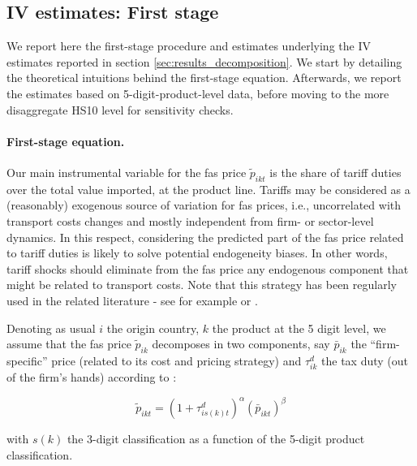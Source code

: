 \documentclass[a4paper,11pt]{article}
\begin{document}
\subsection{IV estimates: First stage \label{app:first_stage_IV}}

We report here the first-stage procedure and estimates underlying the IV estimates reported in section \ref{sec:results_decomposition}. We start by detailing the theoretical intuitions behind the first-stage equation. Afterwards, we report the estimates based on 5-digit-product-level data, before moving to the more disaggregate HS10 level for sensitivity checks.

\paragraph{First-stage equation.}

Our main instrumental variable for the fas price $\widetilde{p}_{ikt}$ is the share of tariff duties over the total value imported, at the product line. Tariffs may be considered as a (reasonably) exogenous source of variation for fas prices, i.e., uncorrelated with transport costs changes and mostly independent from firm- or sector-level dynamics. In this respect, considering the predicted part of the fas price related to tariff duties is likely to solve potential endogeneity biases. In other words, tariff shocks should eliminate from the fas price any endogenous component that might be related to transport costs. Note that this strategy has been regularly used in the related literature - see for example \citet{Caliendo_Parro_2015} or \citet{Lashkaripour-2017}.

Denoting as usual $i$ the origin country, $k$ the product at the 5 digit level, we assume that the fas price $\widetilde{p}_{ik}$ decomposes in two components, say $\bar{p}_{ik}$ the ``firm-specific'' price (related to its cost and pricing strategy) and $\tau^d_{ik}$ the tax duty (out of the firm's hands) according to :

\begin{equation}
\widetilde{p}_{ikt} = (1+\tau^d_{is(k)t})^\alpha \left(\bar{p}_{ikt}\right)^\beta \label{eq:link_fas_duty}
\end{equation}

\noindent with $s(k)$ the 3-digit classification as a function of the 5-digit product classification.
\end{document}

